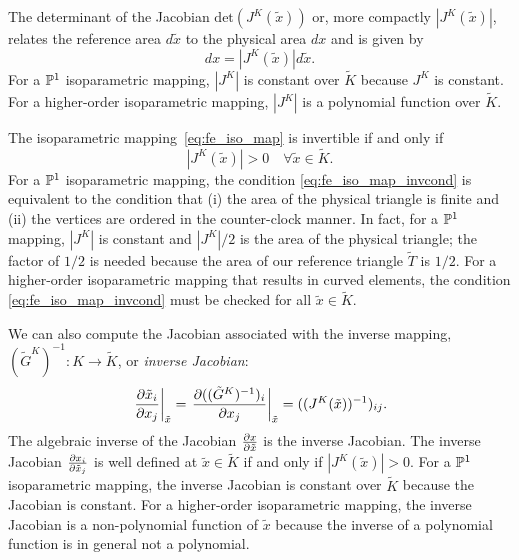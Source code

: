 The determinant of the Jacobian $\text{det}(J^K(\tilde x))$ or, more compactly $|J^K(\tilde x)|$, relates the reference area $d \tilde x$ to the physical area $dx$ and is given by
\begin{equation*}
  dx = |J^K(\tilde x)| d\tilde x.
\end{equation*}
For a $\mathbb{P}^1$ isoparametric mapping, $|J^K|$ is constant over $\tilde K$ because $J^K$ is constant. For a higher-order isoparametric mapping, $|J^K|$ is a polynomial function over $\tilde K$.

The isoparametric mapping~\eqref{eq:fe_iso_map} is invertible if and only if
\begin{equation}
  |J^K(\tilde x)| > 0 \quad \forall \tilde x \in \tilde K.
  \label{eq:fe_iso_map_invcond}
\end{equation}
For a $\mathbb{P}^1$ isoparametric mapping, the condition \eqref{eq:fe_iso_map_invcond} is equivalent to the condition that (i) the area of the physical triangle is finite and (ii) the vertices are ordered in the counter-clock manner.  In fact, for a $\mathbb{P}^1$ mapping, $|J^K|$ is constant and $|J^K|/2$ is the area of the physical triangle; the factor of $1/2$ is needed because the area of our reference triangle $\tilde T$ is $1/2$. For a higher-order isoparametric mapping that results in curved elements, the condition \eqref{eq:fe_iso_map_invcond} must be checked for all $\tilde x \in \tilde K$.

We can also compute the Jacobian associated with the inverse mapping, $(\tilde G^K)^{-1}: K \to \tilde K$, or \emph{inverse Jacobian}:
\begin{equation*}
  \left. \frac{\partial \tilde x_i}{\partial x_j} \right|_{\tilde x}
  = \left. \frac{\partial ((\tilde G^K)^{-1})_i}{\partial x_j} \right|_{\tilde x}
  = ((J^K(\tilde x))^{-1})_{ij}.
\end{equation*}
The algebraic inverse of the Jacobian $\frac{\partial x}{\partial \tilde x}$ is the inverse Jacobian. The inverse Jacobian $\frac{\partial x_i}{\partial \tilde x_j}$ is well defined at $\tilde x \in \tilde K$ if and only if $|J^K(\tilde x)| > 0$.  For a $\mathbb{P}^1$ isoparametric mapping, the inverse Jacobian is constant over $\tilde K$ because the Jacobian is constant.  For a higher-order isoparametric mapping, the inverse Jacobian is a non-polynomial function of $\tilde x$ because the inverse of a polynomial function is in general not a polynomial.

